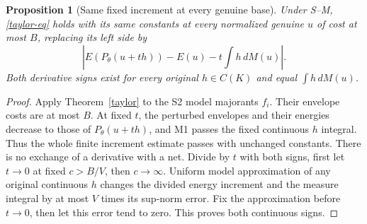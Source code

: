 \documentclass[10pt]{article}
\newtheorem{proposition}[theorem]{Proposition}
\begin{document}
\begin{proposition}[Same fixed increment at every genuine base]\label{fixed-increment}
Under S--M, \eqref{taylor-eq} holds with its same constants at every
normalized genuine $u$ of cost at most $B$, replacing its left side by
\[
 |E(P_\theta(u+th))-E(u)-t\int h\,dM(u)|.
\]
Both derivative signs exist for every original $h\in C(K)$ and equal
$\int h\,dM(u)$.
\end{proposition}
\begin{proof}
Apply Theorem~\ref{taylor} to the S2 model majorants $f_i$. Their
envelope costs are at most $B$. At fixed $t$, the perturbed envelopes
and their energies decrease to those of $P_\theta(u+th)$, and M1
passes the fixed continuous $h$ integral. Thus the whole finite
increment estimate passes with unchanged constants. There is no
exchange of a derivative with a net. Divide by $t$ with both signs,
first let $t\to0$ at fixed $c>B/V$, then $c\to\infty$.
Uniform model approximation of any original continuous $h$ changes
the divided energy increment and the measure integral by at most
$V$ times its sup-norm error. Fix the approximation before $t\to0$,
then let this error tend to zero. This proves both continuous signs.
\end{proof}
\end{document}
